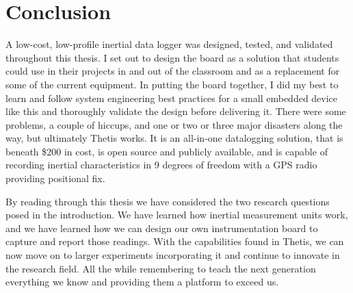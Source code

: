 \chapter{Conclusion} \label{chap:conclusion}
A low-cost, low-profile inertial data logger was designed, tested, and validated throughout this thesis.
I set out to design the board as a solution that students could use in their projects in and out of the classroom and as a replacement for some of the current equipment.
In putting the board together, I did my best to learn and follow system engineering best practices for a small embedded device like this and thoroughly validate the design before delivering it.
There were some problems, a couple of hiccups, and one or two or three major disasters along the way, but ultimately Thetis works.
It is an all-in-one datalogging solution, that is beneath \$200 in cost, is open source and publicly available, and is capable of recording inertial characteristics in 9 degrees of freedom with a GPS radio providing positional fix.

By reading through this thesis we have considered the two research questions posed in the introduction.
We have learned how inertial measurement units work, and we have learned how we can design our own instrumentation board to capture and report those readings.
With the capabilities found in Thetis, we can now move on to larger experiments incorporating it and continue to innovate in the research field.
All the while remembering to teach the next generation everything we know and providing them a platform to exceed us.